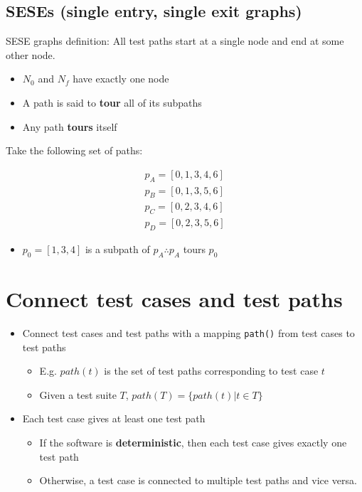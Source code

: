 \documentclass[12pt]{book}
\begin{document}
\subsection{SESEs (single entry, single exit graphs)}
SESE graphs definition: All test paths start at a single node and end at some other node.
\begin{itemize}
  \item $N_0$ and $N_f$ have exactly one node
  \item A path is said to \textbf{tour} all of its subpaths
  \item Any path \textbf{tours} itself
\end{itemize}

Take the following set of paths:

\begin{align*}
  p_A=\left[0,1,3,4,6\right]\\
  p_B=\left[0,1,3,5,6\right]\\
  p_C=\left[0,2,3,4,6\right]\\
  p_D=\left[0,2,3,5,6\right]
\end{align*}

\begin{itemize}
  \item $p_0=\left[1,3,4\right]$ is a subpath of $p_A\therefore p_A$ tours $p_0$ 
\end{itemize}

\section{Connect test cases and test paths}

\begin{itemize}
  \item Connect test cases and test paths with a mapping \texttt{path()} from test cases to test paths
  \begin{itemize}
    \item E.g. $path(t)$ is the set of test paths corresponding to test case $t$
    \item Given a test suite $T$, $path(T)=\{path(t)|t\in T\}$
  \end{itemize}

  \item Each test case gives at least one test path
  \begin{itemize}
    \item If the software is \textbf{deterministic}, then each test case gives exactly one test path
    \item Otherwise, a test case is connected to multiple test paths and vice versa.
  \end{itemize}
\end{itemize}
\end{document}
